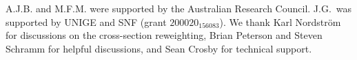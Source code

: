 A.J.B. and M.F.M. were supported by the Australian Research Council. J.G.~was supported by UNIGE and SNF (grant $200020_156083$). We thank Karl Nordstr{\"o}m for discussions on the cross-section reweighting, Brian Peterson and Steven Schramm for helpful discussions, and Sean Crosby for technical support.